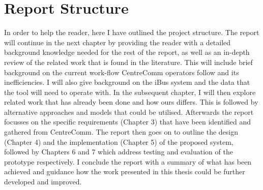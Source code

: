 \section{Report Structure}
In order to help the reader, here I have outlined the project structure. The report will continue in the next chapter by providing the reader with a detailed background knowledge needed for the rest of the report, as well as an in-depth review of the related work that is found in the literature. This will include brief background on the current work-flow CentreComm operators follow and its inefficiencies. I will also give background on the iBus system and the data that the tool will need to operate with. In the subsequent chapter, I will then explore related work that has already been done and how ours differs. This is followed by alternative approaches and models that could be utilised. Afterwards the report focusses on the specific requirements (Chapter 3) that have been identified and gathered from CentreComm. The report then goes on to outline the design (Chapter 4) and the implementation (Chapter 5) of the proposed system,  followed by Chapters 6 and 7 which address testing and evaluation of the prototype respectively. I conclude the report with a summary of what has been achieved and guidance how the work presented in this thesis could be further developed and improved.